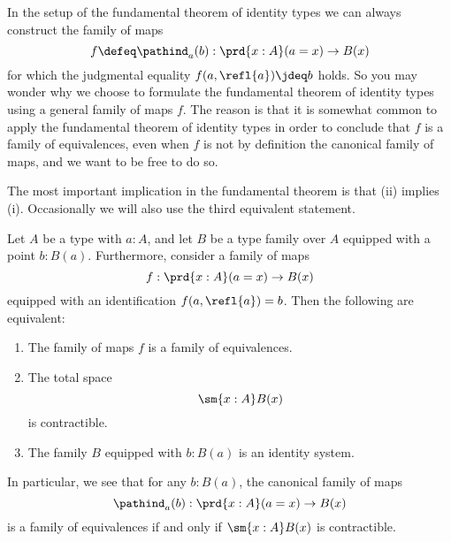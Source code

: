 In the setup of the fundamental theorem of identity types we can always construct the family of maps
\begin{equation*}
  f\defeq\pathind_a(b):\prd{x:A}(a=x)\to B(x)
\end{equation*}
for which the judgmental equality $f(a,\refl{a})\jdeq b$ holds. So you may wonder why we choose to formulate the fundamental theorem of identity types using a general family of maps $f$. The reason is that it is somewhat common to apply the fundamental theorem of identity types in order to conclude that $f$ is a family of equivalences, even when $f$ is not by definition the canonical family of maps, and we want to be free to do so.

The most important implication in the fundamental theorem is that (ii) implies (i). Occasionally we will also use the third equivalent statement.

\begin{thm}\label{thm:id_fundamental}
Let $A$ be a type with $a:A$, and let $B$ be a type family over $A$ equipped with a point $b:B(a)$. Furthermore, consider a family of maps
\begin{equation*}
  f:\prd{x:A}(a=x)\to B(x)
\end{equation*}
equipped with an identification $f(a,\refl{a})=b$. Then the following are equivalent:
\begin{enumerate}
\item The family of maps $f$ is a family of equivalences.
\item The total space
\begin{equation*}
\sm{x:A}B(x)
\end{equation*}
is contractible.
\item The family $B$ equipped with $b:B(a)$ is an identity system.
\end{enumerate}
In particular, we see that for any $b:B(a)$, the canonical family of maps
\begin{equation*}
\pathind_a(b):\prd{x:A} (a=x)\to B(x)
\end{equation*}
is a family of equivalences if and only if $\sm{x:A}B(x)$ is contractible.
\end{thm}

